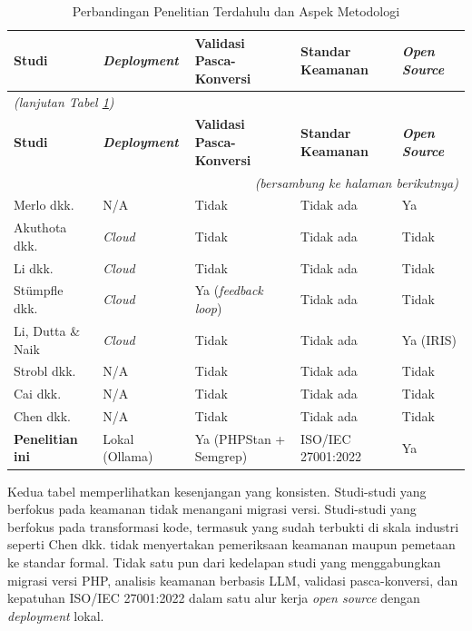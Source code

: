     \begin{longtable}{|l|p{2cm}|p{2.8cm}|p{2.5cm}|p{2cm}|}
    \caption{Perbandingan Penelitian Terdahulu dan Aspek Metodologi}
    \label{tab:perbandingan-2} \\
    \hline
    \textbf{Studi} & \textbf{\textit{Deployment}} & \textbf{Validasi Pasca-Konversi} & \textbf{Standar Keamanan} & \textbf{\textit{Open Source}} \\
    \hline \hline
    \endfirsthead
    \multicolumn{5}{l}{\textit{(lanjutan Tabel \ref{tab:perbandingan-2})}} \\
    \hline
    \textbf{Studi} & \textbf{\textit{Deployment}} & \textbf{Validasi Pasca-Konversi} & \textbf{Standar Keamanan} & \textbf{\textit{Open Source}} \\
    \hline \hline
    \endhead
    \hline
    \multicolumn{5}{r}{\textit{(bersambung ke halaman berikutnya)}} \\
    \endfoot
    \hline
    \endlastfoot
    Merlo dkk. \cite{merlo2007automated} & N/A & Tidak & Tidak ada & Ya \\
    \hline
    Akuthota dkk. \cite{akuthota2023vulnerability} & \textit{Cloud} & Tidak & Tidak ada & Tidak \\
    \hline
    Li dkk. \cite{li2025software} & \textit{Cloud} & Tidak & Tidak ada & Tidak \\
    \hline
    St\"{u}mpfle dkk. \cite{stumpfle2025llm} & \textit{Cloud} & Ya (\textit{feedback loop}) & Tidak ada & Tidak \\
    \hline
    Li, Dutta \& Naik \cite{li2025iris} & \textit{Cloud} & Tidak & Tidak ada & Ya (IRIS) \\
    \hline
    Strobl dkk. \cite{strobl2020automated} & N/A & Tidak & Tidak ada & Tidak \\
    \hline
    Cai dkk. \cite{cai2015pattern} & N/A & Tidak & Tidak ada & Tidak \\
    \hline
    Chen dkk. \cite{chen2022ast} & N/A & Tidak & Tidak ada & Tidak \\
    \hline
    \textbf{Penelitian ini} & Lokal (Ollama) & Ya (PHPStan + Semgrep) & ISO/IEC 27001:2022 & Ya \\
    \hline
    \end{longtable}

    Kedua tabel memperlihatkan kesenjangan yang konsisten. Studi-studi yang berfokus pada keamanan tidak menangani migrasi versi. Studi-studi yang berfokus pada transformasi kode, termasuk yang sudah terbukti di skala industri seperti Chen dkk. \cite{chen2022ast} tidak menyertakan pemeriksaan keamanan maupun pemetaan ke standar formal. Tidak satu pun dari kedelapan studi yang menggabungkan migrasi versi PHP, analisis keamanan berbasis LLM, validasi pasca-konversi, dan kepatuhan ISO/IEC 27001:2022 dalam satu alur kerja \textit{open source} dengan \textit{deployment} lokal.

